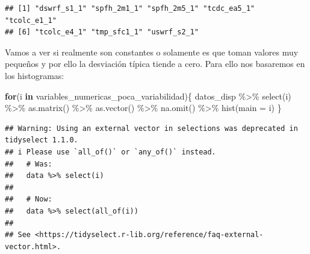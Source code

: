 \documentclass[
  11pt,
  a4paper,
]{article}
\newenvironment{Shaded}{\begin{snugshade}}{\end{snugshade}}
\newcommand{\AttributeTok}[1]{\textcolor[rgb]{0.77,0.63,0.00}{#1}}
\newcommand{\ControlFlowTok}[1]{\textcolor[rgb]{0.13,0.29,0.53}{\textbf{#1}}}
\newcommand{\FunctionTok}[1]{\textcolor[rgb]{0.00,0.00,0.00}{#1}}
\newcommand{\NormalTok}[1]{#1}
\newcommand{\SpecialCharTok}[1]{\textcolor[rgb]{0.00,0.00,0.00}{#1}}
\begin{document}
\begin{verbatim}
## [1] "dswrf_s1_1" "spfh_2m1_1" "spfh_2m5_1" "tcdc_ea5_1" "tcolc_e1_1"
## [6] "tcolc_e4_1" "tmp_sfc1_1" "uswrf_s2_1"
\end{verbatim}

Vamos a ver si realmente son constantes o solamente es que toman valores
muy pequeños y por ello la desviación típica tiende a cero. Para ello
nos basaremos en los histogramas:

\begin{Shaded}
\begin{Highlighting}[]
\ControlFlowTok{for}\NormalTok{(i }\ControlFlowTok{in}\NormalTok{ variables\_numericas\_poca\_variabilidad)\{}
\NormalTok{        datos\_disp }\SpecialCharTok{\%\textgreater{}\%} \FunctionTok{select}\NormalTok{(i) }\SpecialCharTok{\%\textgreater{}\%} \FunctionTok{as.matrix}\NormalTok{() }\SpecialCharTok{\%\textgreater{}\%} \FunctionTok{as.vector}\NormalTok{() }\SpecialCharTok{\%\textgreater{}\%} \FunctionTok{na.omit}\NormalTok{() }\SpecialCharTok{\%\textgreater{}\%} \FunctionTok{hist}\NormalTok{(}\AttributeTok{main =}\NormalTok{ i)}
\NormalTok{\}}
\end{Highlighting}
\end{Shaded}

\begin{verbatim}
## Warning: Using an external vector in selections was deprecated in tidyselect 1.1.0.
## i Please use `all_of()` or `any_of()` instead.
##   # Was:
##   data %>% select(i)
## 
##   # Now:
##   data %>% select(all_of(i))
## 
## See <https://tidyselect.r-lib.org/reference/faq-external-vector.html>.
\end{verbatim}
\end{document}
